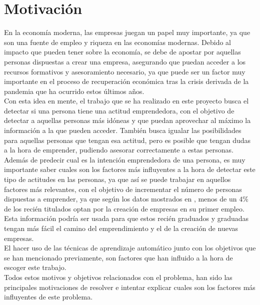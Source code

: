 \section{Motivación}
En la economía moderna, las empresas juegan un papel muy importante, ya que son una fuente de empleo y riqueza en las economías modernas. Debido al impacto que pueden tener sobre la economía, se debe de apostar por aquellas personas dispuestas a crear una empresa, asegurando que puedan acceder a los recursos formativos y asesoramiento necesario, ya que puede ser un factor muy importante en el proceso de recuperación económica tras la crisis derivada de la pandemia que ha ocurrido estos últimos años.\\
\linebreak
Con esta idea en mente, el trabajo que se ha realizado en este proyecto busca el detectar si una persona tiene una actitud emprendedora, con el objetivo de detectar a aquellas personas más idóneas y que puedan aprovechar al máximo la información a la que pueden acceder. También busca igualar las posibilidades para aquellas personas que tengan esa actitud, pero es posible que tengan dudas a la hora de emprender, pudiendo asesorar correctamente a estas personas.\\
\linebreak
Además de predecir cual es la intención emprendedora de una persona, es muy importante saber cuales son los factores más influyentes a la hora de detectar este tipo de actitudes en las personas, ya que así se puede trabajar en aquellos factores más relevantes, con el objetivo de incrementar el número de personas dispuestas a emprender, ya que según los datos mostrados en \cite{ie}, menos de un $4\%$ de los recién titulados optan por la creación de empresas en su primer empleo. Esta información podría ser usada para que estos recién graduados y graduadas tengan más fácil el camino del emprendimiento y el de la creación de nuevas empresas.\\
\linebreak
El hacer uso de las técnicas de aprendizaje automático junto con los objetivos que se han mencionado previamente, son factores que han influido a la hora de escoger este trabajo.\\
\linebreak
Todos estos motivos y objetivos relacionados con el problema, han sido las principales motivaciones de resolver e intentar explicar cuales son los factores más influyentes de este problema.
\clearpage
